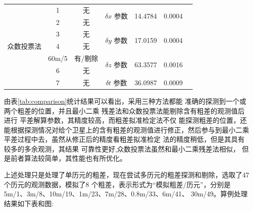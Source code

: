 \documentclass[12pt,hyperref,a4paper,UTF8]{ctexart}
\begin{document}
\begin{table}[h]
\begin{tabular}{ccccccc}
    \multirow{7}{*}{众数投票法} & 1 & 无 & \multirow{2}{*}{$\delta x$ 参数} &\multirow{2}{*}{14.4784} & \multirow{2}{*}{0.0004} \\
    & 2 & 无 &  & &  \\
    & 3 & 无 & \multirow{2}{*}{$\delta y$ 参数} &\multirow{2}{*}{17.0159}  & \multirow{2}{*}{0.0004} \\
    & 4 & 无 &  & &  \\
    & 60m/5 & 有/剔除 & \multirow{2}{*}{$\delta z$ 参数} &\multirow{2}{*}{63.3577}  & \multirow{2}{*}{0.0016} \\
    & 6 & 无 &  &  &  \\
    & 7 & 无 & $\delta t$ 参数 & 36.0987 & 0.0009 \\
    \bottomrule
    \end{tabular}
\end{table}

由表\ref{tab:comparison}统计结果可以看出，采用三种方法都能
准确的探测到一个或两个粗差的位置，并且最小二乘
残差法和众数投票法能剔除含有粗差的观测值后进行
平差解算参数，其精度较高，而粗差拟准检定法不仅
能探测粗差的位置，还能根据探测情况对给个卫星上的含有粗差的观测值进行修正，然后参与到最小二乘
平差过程中去，虽然从修正后的精度看粗差拟准检定
法的精度稍低，但是其具有较多的多余观测，其结果
可靠性更好,众数投票法虽然和最小二乘残差法相似，
但是前者算法较简单，其性能也有所优化。

上述处理只是处理了单历元的粗差，现在尝试多历元的粗差探测和剔除，选取了47个历元的观测数据，模拟了8
个粗差，表示形式为“模拟粗差/历元”\cite{8}，分别是
5m/1、3m/8、10m/19、1m/23、7m/28、0.8m/33、6m/41、
30m/49。算例处理结果如下表和图:
\end{document}
